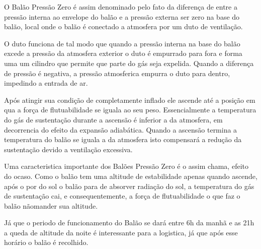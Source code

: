     O Balão Pressão Zero é assim denominado pelo fato da diferença de entre a pressão interna ao envelope do balão e a pressão externa ser zero na base do balão, local onde o balão é conectado a atmosfera por um duto de ventilação.
    
    O duto funciona de tal modo que quando a pressão interna na base do balão excede a pressão da atmosfera exterior o duto é empurrado para fora e forma uma um cilindro que permite que parte do gás seja expelida. Quando a diferença de pressão é negativa, a pressão atmosferica empurra o duto para dentro, impedindo a entrada de ar.
    
    Após atingir sua condição de completamente inflado ele ascende até a posição em qua a força de flutuabilidade se iguala ao seu peso. Essencialmente a temperatura do gás de sustentação durante a ascensão é inferior a da atmosfera, em decorrencia do efeito da expansão adiabática. Quando a ascensão termina a temperatura do balão se iguala a da atmosfera isto compensará a redução da sustentação devido a ventilação excessiva.
    
    Uma caracteristica importante dos Balões Pressão Zero é o assim chama, efeito do ocaso. Como o balão tem uma altitude de estabilidade apenas quando ascende, após o por do sol o balão para de absorver radiação do sol, a temperatura do gás de sustentação cai, e consequentemente, a  força de flutuabilidade o que faz o balão nãomander sua altitude.
    
    Já que o periodo de funcionamento do Balão se dará entre 6h da manhã e as 21h a queda de altitude da noite é interessante  para a logistica, já que após esse horário o balão é recolhido.
    

